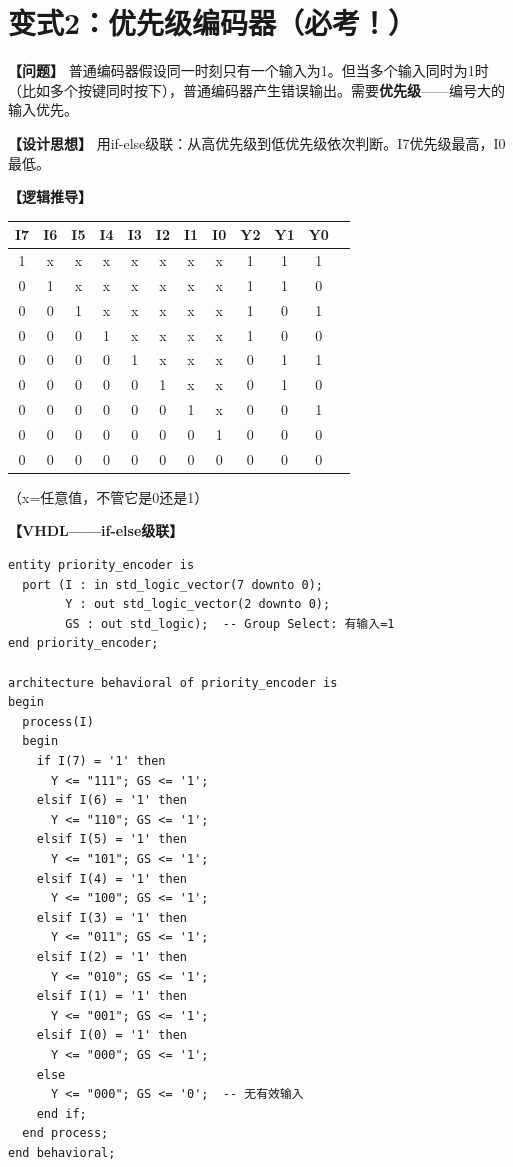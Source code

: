 \section{变式2：优先级编码器（必考！）}

\begin{detailbox}[完整教学]

\textbf{【问题】}
普通编码器假设同一时刻只有一个输入为1。但当多个输入同时为1时（比如多个按键同时按下），普通编码器产生错误输出。需要\textbf{优先级}——编号大的输入优先。

\textbf{【设计思想】}
用if-else级联：从高优先级到低优先级依次判断。I7优先级最高，I0最低。

\textbf{【逻辑推导】}
\begin{center}
\begin{tabular}{|c|c|c|c|c|c|c|c|c||c|c|c|}
\hline
I7 & I6 & I5 & I4 & I3 & I2 & I1 & I0 & Y2 & Y1 & Y0 \\
\hline
1 & x & x & x & x & x & x & x & 1 & 1 & 1 \\
0 & 1 & x & x & x & x & x & x & 1 & 1 & 0 \\
0 & 0 & 1 & x & x & x & x & x & 1 & 0 & 1 \\
0 & 0 & 0 & 1 & x & x & x & x & 1 & 0 & 0 \\
0 & 0 & 0 & 0 & 1 & x & x & x & 0 & 1 & 1 \\
0 & 0 & 0 & 0 & 0 & 1 & x & x & 0 & 1 & 0 \\
0 & 0 & 0 & 0 & 0 & 0 & 1 & x & 0 & 0 & 1 \\
0 & 0 & 0 & 0 & 0 & 0 & 0 & 1 & 0 & 0 & 0 \\
0 & 0 & 0 & 0 & 0 & 0 & 0 & 0 & 0 & 0 & 0 \\
\hline
\end{tabular}
\end{center}
（x=任意值，不管它是0还是1）

\textbf{【VHDL——if-else级联】}
\begin{lstlisting}
entity priority_encoder is
  port (I : in std_logic_vector(7 downto 0);
        Y : out std_logic_vector(2 downto 0);
        GS : out std_logic);  -- Group Select: 有输入=1
end priority_encoder;

architecture behavioral of priority_encoder is
begin
  process(I)
  begin
    if I(7) = '1' then
      Y <= "111"; GS <= '1';
    elsif I(6) = '1' then
      Y <= "110"; GS <= '1';
    elsif I(5) = '1' then
      Y <= "101"; GS <= '1';
    elsif I(4) = '1' then
      Y <= "100"; GS <= '1';
    elsif I(3) = '1' then
      Y <= "011"; GS <= '1';
    elsif I(2) = '1' then
      Y <= "010"; GS <= '1';
    elsif I(1) = '1' then
      Y <= "001"; GS <= '1';
    elsif I(0) = '1' then
      Y <= "000"; GS <= '1';
    else
      Y <= "000"; GS <= '0';  -- 无有效输入
    end if;
  end process;
end behavioral;
\end{lstlisting}


\end{detailbox}
